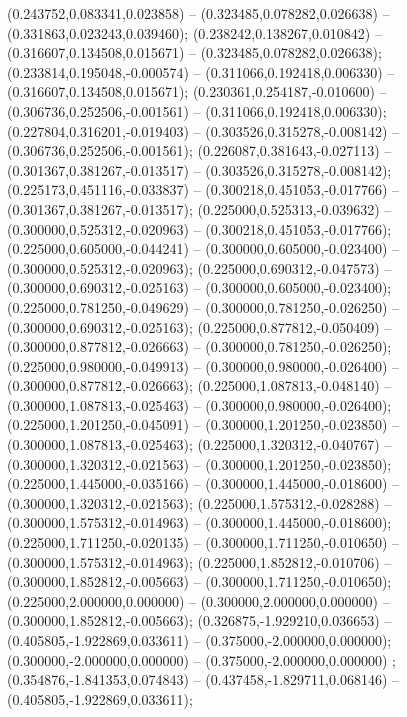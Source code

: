  (0.243752,0.083341,0.023858) -- (0.323485,0.078282,0.026638) -- (0.331863,0.023243,0.039460);
 (0.238242,0.138267,0.010842) -- (0.316607,0.134508,0.015671) -- (0.323485,0.078282,0.026638);
 (0.233814,0.195048,-0.000574) -- (0.311066,0.192418,0.006330) -- (0.316607,0.134508,0.015671);
 (0.230361,0.254187,-0.010600) -- (0.306736,0.252506,-0.001561) -- (0.311066,0.192418,0.006330);
 (0.227804,0.316201,-0.019403) -- (0.303526,0.315278,-0.008142) -- (0.306736,0.252506,-0.001561);
 (0.226087,0.381643,-0.027113) -- (0.301367,0.381267,-0.013517) -- (0.303526,0.315278,-0.008142);
 (0.225173,0.451116,-0.033837) -- (0.300218,0.451053,-0.017766) -- (0.301367,0.381267,-0.013517);
 (0.225000,0.525313,-0.039632) -- (0.300000,0.525312,-0.020963) -- (0.300218,0.451053,-0.017766);
 (0.225000,0.605000,-0.044241) -- (0.300000,0.605000,-0.023400) -- (0.300000,0.525312,-0.020963);
 (0.225000,0.690312,-0.047573) -- (0.300000,0.690312,-0.025163) -- (0.300000,0.605000,-0.023400);
 (0.225000,0.781250,-0.049629) -- (0.300000,0.781250,-0.026250) -- (0.300000,0.690312,-0.025163);
 (0.225000,0.877812,-0.050409) -- (0.300000,0.877812,-0.026663) -- (0.300000,0.781250,-0.026250);
 (0.225000,0.980000,-0.049913) -- (0.300000,0.980000,-0.026400) -- (0.300000,0.877812,-0.026663);
 (0.225000,1.087813,-0.048140) -- (0.300000,1.087813,-0.025463) -- (0.300000,0.980000,-0.026400);
 (0.225000,1.201250,-0.045091) -- (0.300000,1.201250,-0.023850) -- (0.300000,1.087813,-0.025463);
 (0.225000,1.320312,-0.040767) -- (0.300000,1.320312,-0.021563) -- (0.300000,1.201250,-0.023850);
 (0.225000,1.445000,-0.035166) -- (0.300000,1.445000,-0.018600) -- (0.300000,1.320312,-0.021563);
 (0.225000,1.575312,-0.028288) -- (0.300000,1.575312,-0.014963) -- (0.300000,1.445000,-0.018600);
 (0.225000,1.711250,-0.020135) -- (0.300000,1.711250,-0.010650) -- (0.300000,1.575312,-0.014963);
 (0.225000,1.852812,-0.010706) -- (0.300000,1.852812,-0.005663) -- (0.300000,1.711250,-0.010650);
 (0.225000,2.000000,0.000000) -- (0.300000,2.000000,0.000000) -- (0.300000,1.852812,-0.005663);
 (0.326875,-1.929210,0.036653) -- (0.405805,-1.922869,0.033611) -- (0.375000,-2.000000,0.000000);
 (0.300000,-2.000000,0.000000) -- (0.375000,-2.000000,0.000000) ;
 (0.354876,-1.841353,0.074843) -- (0.437458,-1.829711,0.068146) -- (0.405805,-1.922869,0.033611);

